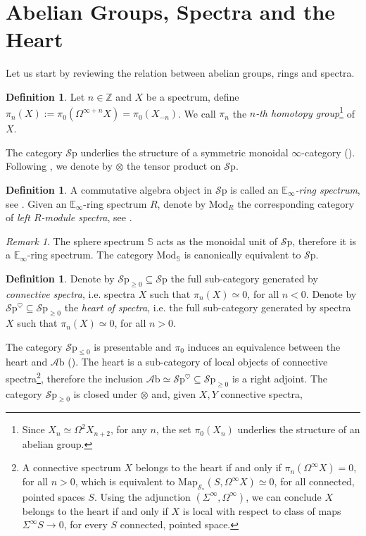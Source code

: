 \documentclass[10pt]{amsart}
\newcommand{\bE}{\mathbb{E}}
\newcommand{\s}{\mathscr{S}}
\newcommand{\bS}{\mathbb{S}}
\newcommand{\bZ}{\mathbb{Z}}
\newcommand{\Map}{\mathrm{Map}}
\newcommand{\Sp}{\mathscr{S}\mathrm{p}}
\newcommand{\Mod}{\mathrm{Mod}}
\newcommand{\Ab}{\mathscr{A}\mathrm{b}}
\theoremstyle{definition}
\newtheorem{definition}[equation]{Definition}
\theoremstyle{remark}
\newtheorem{remark}[equation]{Remark}
\begin{document}
\section{Abelian Groups, Spectra and the Heart}
Let us start by reviewing the relation between abelian groups, rings and spectra. 
\begin{definition}
    Let $n\in\bZ$ and $X$ be a spectrum, define $\pi_n(X):=\pi_0(\Omega^{\infty+n}X)=\pi_0(X_{-n})$. We call $\pi_n$ the \textit{$n$-th homotopy group}\footnote{Since $X_n\simeq\Omega^2X_{n+2}$, for any $n$, the set $\pi_0(X_n)$ underlies the structure of an abelian group.} of $X$. 
  \end{definition}
  The category $\Sp$ underlies the structure of a symmetric monoidal $\infty$-category (\cite[Corollary 4.8.2.19]{lurie2017ha}). Following \cite{lurie2017ha}, we denote by $\otimes$ the tensor product on $\Sp$.
  \begin{definition}A commutative algebra object in $\Sp$ is called an \emph{$\bE_\infty$-ring spectrum}, see \cite[Definition 7.1.0.1]{lurie2017ha}. Given an $\bE_\infty$-ring spectrum $R$, denote by $\Mod_R$ the corresponding category of \emph{left $R$-module spectra}, see \cite[Definition 7.1.1.2]{lurie2017ha}. 
  \end{definition}
  \begin{remark}
    The sphere spectrum $\bS$ acts as the monoidal unit of $\Sp$, therefore it is a $\bE_\infty$-ring spectrum. The category $\Mod_\bS$ is canonically equivalent to $\Sp$. 
  \end{remark}
    \begin{definition}
    Denote by $\Sp_{\geq0}\subseteq\Sp$ the full sub-category generated by \emph{connective spectra}, i.e. spectra $X$ such that $\pi_n(X)\simeq0$, for all $n<0$. Denote by $\Sp^\heartsuit\subseteq\Sp_{\geq0}$ the \emph{heart of spectra}, i.e. the full sub-category generated by spectra $X$ such that $\pi_n(X)\simeq0$, for all $n>0$.
  \end{definition}
  The category $\Sp_{\leq0}$ is presentable and $\pi_0$ induces an equivalence between the heart and $\Ab$ (\cite[Proposition 1.4.3.6]{lurie2017ha}). The heart is a sub-category of local objects of connective spectra\footnote{A connective spectrum $X$ belongs to the heart if and only if $\pi_n(\Omega^\infty X)=0$, for all $n>0$, which is equivalent to $\Map_{\s_*}(S,\Omega^\infty X)\simeq0$, for all connected, pointed spaces $S$. Using the adjunction $(\Sigma^\infty,\Omega^\infty)$, we can conclude $X$ belongs to the heart if and only if $X$ is local with respect to class of maps $\Sigma^\infty S\to0$, for every $S$ connected, pointed space.}, therefore the inclusion $\Ab\simeq\Sp^\heartsuit\subseteq\Sp_{\geq0}$ is a right adjoint. The category $\Sp_{\geq0}$ is closed under $\otimes$ and, given $X,Y$ connective spectra, 
\end{document}

